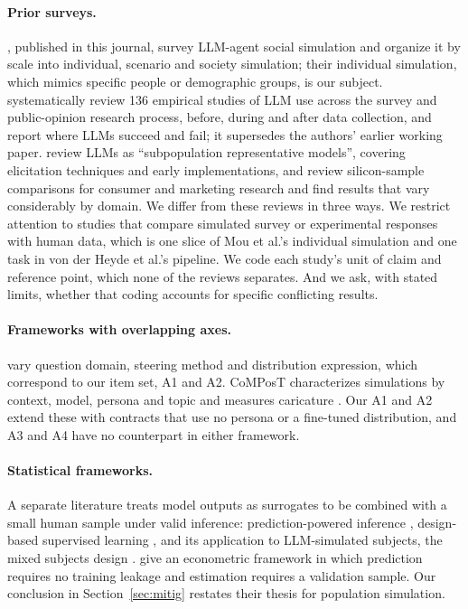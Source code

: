 \documentclass[11pt]{article}
\begin{document}
\paragraph{Prior surveys.} \citet{mou2024}, published in this journal, survey LLM-agent social simulation and organize it by scale into individual, scenario and society simulation; their individual simulation, which mimics specific people or demographic groups, is our subject. \citet{vonderheyde2026review} systematically review 136 empirical studies of LLM use across the survey and public-opinion research process, before, during and after data collection, and report where LLMs succeed and fail; it supersedes the authors' earlier working paper. \citet{simmons2023} review LLMs as ``subpopulation representative models'', covering elicitation techniques and early implementations, and \citet{sarstedt2024} review silicon-sample comparisons for consumer and marketing research and find results that vary considerably by domain. We differ from these reviews in three ways. We restrict attention to studies that compare simulated survey or experimental responses with human data, which is one slice of Mou et al.'s individual simulation and one task in von der Heyde et al.'s pipeline. We code each study's unit of claim and reference point, which none of the reviews separates. And we ask, with stated limits, whether that coding accounts for specific conflicting results.

\paragraph{Frameworks with overlapping axes.} \citet{meister2024} vary question domain, steering method and distribution expression, which correspond to our item set, A1 and A2. CoMPosT characterizes simulations by context, model, persona and topic and measures caricature \citep{cheng2023compost}. Our A1 and A2 extend these with contracts that use no persona or a fine-tuned distribution, and A3 and A4 have no counterpart in either framework.

\paragraph{Statistical frameworks.} A separate literature treats model outputs as surrogates to be combined with a small human sample under valid inference: prediction-powered inference \citep{angelopoulos2023}, design-based supervised learning \citep{egami2023}, and its application to LLM-simulated subjects, the mixed subjects design \citep{broska2024}. \citet{ludwig2024} give an econometric framework in which prediction requires no training leakage and estimation requires a validation sample. Our conclusion in Section~\ref{sec:mitig} restates their thesis for population simulation.
\end{document}
